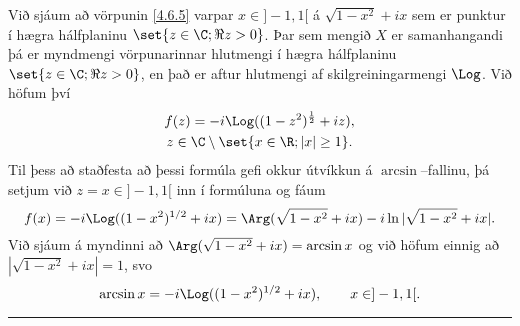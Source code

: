 \begin{sy}
Við sjáum að vörpunin \ref{4.6.5}
varpar $x\in ]-1,1[$ á $\sqrt{1-x^2}+ix$ sem er punktur í hægra
hálfplaninu $\set{z\in \C; \Re z>0}$.  
Þar sem mengið $X$ er samanhangandi þá er myndmengi 
vörpunarinnar hlutmengi í hægra hálfplaninu $\set{z\in \C; \Re
z>0}$, en það er aftur hlutmengi af skilgreiningarmengi $\Log$.
Við höfum því 
\begin{multline*}
f(z) = -i\Log ((1-z^2)^{\frac 12}+iz), \\
z\in \C\setminus\set{x\in \R;|x|\geq 1}.
\end{multline*}
Til þess að staðfesta að þessi formúla gefi okkur útvíkkun
á $\arcsin$--fallinu, þá setjum við $z=x\in ]-1,1[$ inn í formúluna
og fáum 
$$
f(x)=-i\Log((1-x^2)^{1/2}+ix)=\Arg(\sqrt{1-x^2}+ix)-i\ln|\sqrt{1-x^2}+ix|.$$
Við sjáum á myndinni að 
$\Arg(\sqrt{1-x^2}+ix)=\arcsin x$ og við höfum einnig að
$|\sqrt{1-x^2}+ix|=1$, svo 
$$\arcsin x=-i\Log((1-x^2)^{1/2}+ix),\qquad x\in ]-1,1[.
$$
\end{sy}

\bigskip\hrule\bigskip

